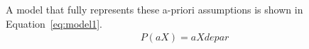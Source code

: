 A model that fully represents these a-priori assumptions is shown in Equation~\ref{eq:model1}.
\begin{align}
    P(aX) = aXdepar
\end{align}
